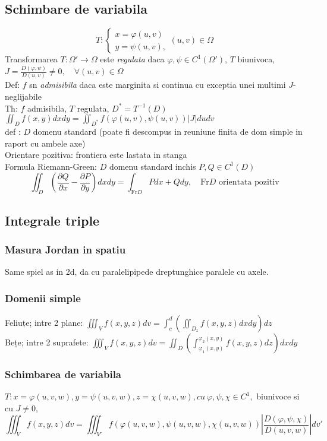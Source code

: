 \documentclass{article}
\newcommand{\parti}[2]{\frac{\partial #1}{ \partial #2}}
\begin{document}
\subsection*{Schimbare de variabila}
\[
  T: \begin{cases}
    x = \varphi(u, v)\\
    y = \psi(u, v),
  \end{cases}
   (u, v) \in \Omega
\]
Transformarea $T:\Omega'\to\Omega$ este \emph{regulata} daca $\varphi, \psi \in C^1(\Omega')$, $T$ biunivoca, $J = \frac{D(\varphi, \psi)}{D(u, v)} \neq 0, \quad
\forall (u, v) \in \Omega$\\
Def: $f$ sn \emph{admisibila} daca este marginita si continua cu exceptia unei multimi $J$-neglijabile\\
Th: $f$ admisibila, $T$ regulata, $D^* = T^{-1}(D)$\quad $\displaystyle \iint_D f(x, y) dxdy = \iint_{D^*} f(\varphi(u, v), \psi(u, v))|J| du dv $\\
def : $D$ domenu standard (poate fi descompus in reuniune finita de dom simple in raport cu ambele axe)\\
Orientare pozitiva: frontiera este lastata in stanga\\ 
Formula Riemann-Green: $D$ domenu standard inchis $P, Q \in C^1(D)$
\[\iint_D \left( \parti{Q}{x} - \parti{P}{y} \right) dx dy = \int_{\mathrm{Fr}D} Pdx+Qdy, \quad \mathrm{Fr}D \text{  orientata pozitiv} \]
\subsection*{Integrale triple}
\subsubsection*{Masura Jordan in spatiu}
Same spiel as in 2d, da cu paralelipipede dreptunghice paralele cu axele.
\subsubsection*{Domenii simple}
Feliuțe; intre 2 plane: $\displaystyle \iiint_V f(x, y, z) dv = \int_c^d \left( \iint_{D_z} f(x, y,z) dx dy \right) dz$\\
Bețe; intre 2 suprafete: $\displaystyle \iiint_V f(x, y, z) dv = \iint_D \left( \int_{\varphi_1(x,y)}^{\varphi_2(x,y)} f(x, y,z) dz \right) dx dy$\\
\subsubsection*{Schimbarea de variabila}
$T: x= \varphi(u, v, w), y= \psi(u, v, w), z= \chi(u, v, w), cu\ \varphi, \psi, \chi \in C^1,$ biunivoce si cu $J \neq 0 $,
\[ \iiint_V f(x, y, z) dv = \iiint_{V'} f(\varphi(u, v, w), \psi(u, v, w), \chi(u, v, w)) \left|\frac{D(\varphi, \psi, \chi)}{D(u,v,w)}\right| dv' \]
\end{document}
